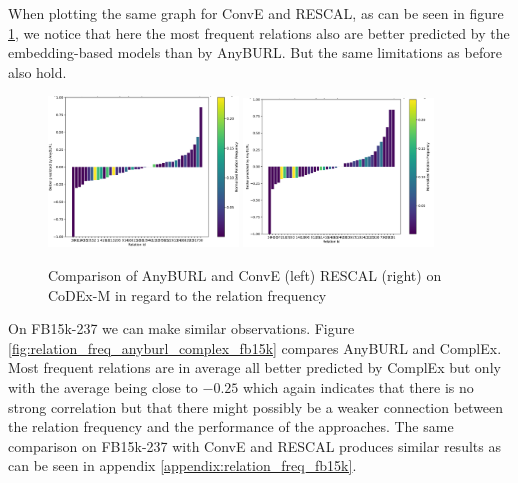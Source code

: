 When plotting the same graph for ConvE and RESCAL, as can be seen in figure \ref{fig:relation_freq_anyburl_conve_rescal_codex}, we notice that here the most frequent relations also are better predicted by the embedding-based models than by AnyBURL. But the same limitations as before also hold.

\begin{figure}[H]
\centering
\includegraphics[width=0.45\textwidth]{images/relation_freq_anyburl_conve_codex.PNG}
\includegraphics[width=0.45\textwidth]{images/relation_freq_anyburl_rescal_codex.PNG}
\caption{Comparison of AnyBURL and ConvE (left) RESCAL (right) on CoDEx-M in regard to the relation frequency}
\label{fig:relation_freq_anyburl_conve_rescal_codex}
\end{figure}

On FB15k-237 we can make similar observations. Figure \ref{fig:relation_freq_anyburl_complex_fb15k} compares AnyBURL and ComplEx. Most frequent relations are in average all better predicted by ComplEx but only with the average being close to $-0.25$ which again indicates that there is no strong correlation but that there might possibly be a weaker connection between the relation frequency and the performance of the approaches. The same comparison on FB15k-237 with ConvE and RESCAL produces similar results as can be seen in appendix \ref{appendix:relation_freq_fb15k}.

